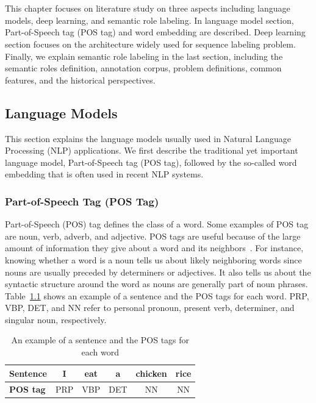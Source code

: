\chapter{\babDua}
This chapter focuses on literature study on three aspects including language models, deep learning, and semantic role labeling. In language model section, Part-of-Speech tag (POS tag) and word embedding are described. Deep learning section focuses on the architecture widely used for sequence labeling problem. Finally, we explain semantic role labeling in the last section, including the semantic roles definition, annotation corpus, problem definitions, common features, and the historical perspectives.
\section{Language Models}
This section explains the language models usually used in Natural Language Processing (NLP) applications. We first describe the traditional yet important language model, Part-of-Speech tag (POS tag), followed by the so-called word embedding that is often used in recent NLP systems.

\subsection{Part-of-Speech Tag (POS Tag)}
Part-of-Speech (POS) tag defines the class of a word. Some examples of POS tag are noun, verb, adverb, and adjective. POS tags are useful because of the large amount of information they give about a word and its neighbors~\citep{jurafsky2016speech}. For instance, knowing whether a word is a noun tells us about likely neighboring words since nouns are usually preceded by determiners or adjectives. It also tells us about the syntactic structure around the word as nouns are generally part of noun phrases. Table~\ref{tab:examplepostheory} shows an example of a sentence and the POS tags for each word. PRP, VBP, DET, and NN refer to personal pronoun, present verb, determiner, and singular noun, respectively.

\begin{table}
	\centering
	\caption{An example of a sentence and the POS tags for each word}
	\label{tab:examplepostheory}
	\begin{tabular}{|lccccc|}
		\hline
		\textbf{Sentence} 				& I & eat & a &chicken & rice \\
		\hline
		\textbf{POS tag}		& PRP & VBP & DET & NN & NN \\
		\hline
	\end{tabular}
\end{table}

